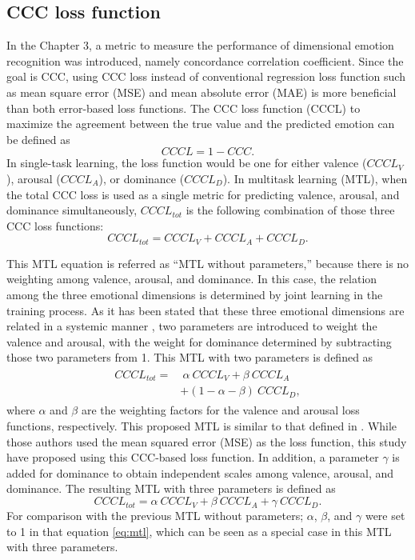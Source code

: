 \subsection{CCC loss function}

In the Chapter 3, a metric to measure the performance of dimensional emotion
recognition was introduced, namely concordance correlation coefficient. Since
the goal is CCC, using CCC loss instead of conventional regression loss
function such as mean square error (MSE) and mean absolute error (MAE) is more
beneficial than both error-based loss functions.  The CCC loss function (CCCL)
to maximize the agreement between the true value and the predicted emotion can
be defined as 
\begin{equation}
 CCCL = 1 - CCC.
\end{equation}
In single-task learning, the loss function would be one for either valence
($CCCL_{V}$), arousal ($CCCL_{A}$), or dominance ($CCCL_{D}$). In multitask
learning (MTL), when the total CCC loss is used as a single metric for
predicting valence, arousal, and dominance simultaneously, $CCCL_{tot}$ is the
following combination of those three CCC loss functions:
\begin{equation}
 CCCL_{tot} = CCCL_{V} + CCCL_{A} + CCCL_{D}.
\label{eq:mtl}
\end{equation}

\noindent This MTL equation is referred as ``MTL without parameters,'' because
there is no weighting among valence, arousal, and dominance. In this case, the
relation among the three emotional dimensions is determined by joint learning
in the training process. As it has been stated that these three emotional
dimensions are related in a systemic manner \cite{Gunes2010}, two parameters
are introduced to weight the valence and arousal, with the weight for dominance
determined by subtracting those two parameters from 1. This MTL with two
parameters is defined as
\begin{align}
\begin{split}
 CCCL_{tot} =& ~ \alpha ~ CCCL_{V} + \beta ~ CCCL_{A} \\
 &+ (1-\alpha-\beta) ~ CCCL_{D},
\label{eq:mtl-2}
\end{split}
\end{align}
where $\alpha$ and $\beta$ are the weighting factors for the valence and
arousal loss functions, respectively. This proposed MTL is similar to that
defined in \cite{parthasarathy2017jointly}. While those authors used the mean
squared error (MSE) as the loss function, this study have proposed using this
CCC-based loss function. In addition, a parameter $\gamma$ is added for
dominance to obtain independent scales among valence, arousal, and dominance.
The resulting MTL with three parameters is defined as 
\begin{equation}
 CCCL_{tot} = \alpha ~ CCCL_{V} + \beta ~ CCCL_{A} + \gamma ~ CCCL_{D}.
\label{eq:mtl-3}
\end{equation}
For comparison with the previous MTL without parameters; $\alpha$, $\beta$, and
$\gamma$ were set to 1 in that equation \ref{eq:mtl}, which can be seen as a
special case in this MTL with three parameters.

